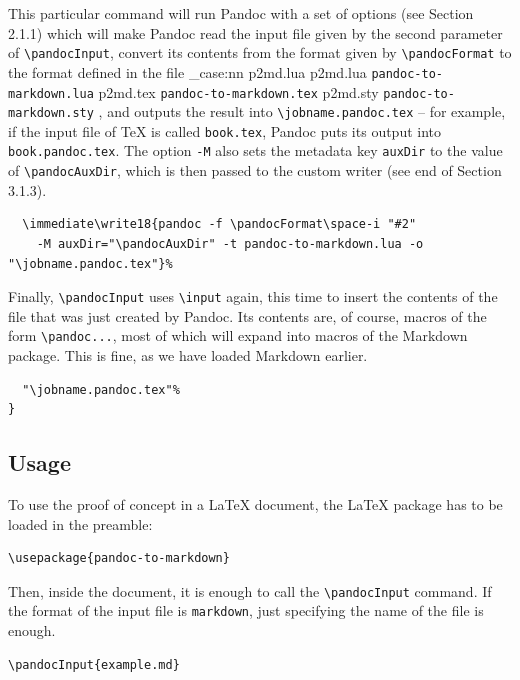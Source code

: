 \documentclass[
  digital,     %
  oneside,     %
  nosansbold,  %
  nocolorbold, %
  lof,         %
  nolot,       %
]{fithesis4}
\newcommand\macro[1]{\texttt{\textbackslash{}{#1}}}
\newcommand\file[1]
  {
    \str_case:nn
      { #1 }
      {
        { p2md.lua } { \texttt{pandoc\hyp{}to\hyp{}markdown.lua} }
        { p2md.tex } { \texttt{pandoc\hyp{}to\hyp{}markdown.tex} }
        { p2md.sty } { \texttt{pandoc\hyp{}to\hyp{}markdown.sty} }
      }
  }
\begin{document}
This particular command will run Pandoc with a set of options (see Section 2.1.1) which will make Pandoc read the input file given by the second parameter of \macro{pandocInput}, convert its contents from the format given by \macro{pandocFormat} to the format defined in the file \file{p2md.lua}, and outputs the result into \macro{jobname.pandoc.tex} -- for example, if the input file of \TeX{} is called \texttt{book.tex}, Pandoc puts its output into \texttt{book.pandoc.tex}.
The option \texttt{-M} also sets the metadata key \texttt{auxDir} to the value of \macro{pandocAuxDir}, which is then passed to the custom writer (see end of Section 3.1.3).

\noindent
\lstset{language=[LaTeX]TeX}
\begin{lstlisting}
  \immediate\write18{pandoc -f \pandocFormat\space-i "#2"
    -M auxDir="\pandocAuxDir" -t pandoc-to-markdown.lua -o "\jobname.pandoc.tex"}%
\end{lstlisting}

\noindent
Finally, \macro{pandocInput} uses \macro{input} again, this time to insert the contents of the file that was just created by Pandoc. Its contents are, of course, macros of the form \macro{pandoc...}, most of which will expand into macros of the Markdown package. This is fine, as we have loaded Markdown earlier.

\noindent
\lstset{language=[LaTeX]TeX}
\begin{lstlisting}
  "\jobname.pandoc.tex"%
}
\end{lstlisting}

\subsection{Usage}
To use the proof of concept in a \LaTeX{} document, the \LaTeX{} package has to be loaded in the preamble:

\noindent
\lstset{language=[LaTeX]TeX}
\begin{lstlisting}
\usepackage{pandoc-to-markdown}
\end{lstlisting}

\noindent
Then, inside the document, it is enough to call the \macro{pandocInput} command. If the format of the input file is \texttt{markdown}, just specifying the name of the file is enough.

\noindent
\lstset{language=[LaTeX]TeX}
\begin{lstlisting}
\pandocInput{example.md}
\end{lstlisting}
\end{document}
